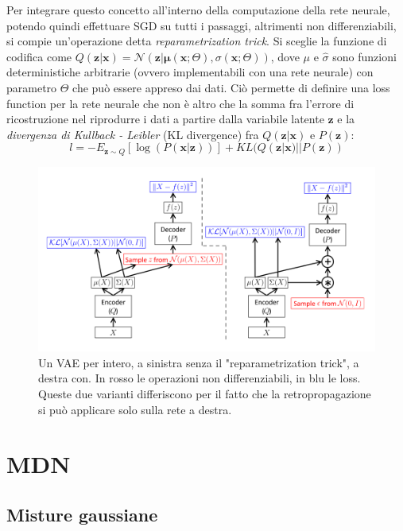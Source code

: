Per integrare questo concetto all'interno della computazione della rete neurale, potendo quindi effettuare SGD su tutti i passaggi, altrimenti non differenziabili, si compie un'operazione detta \textit{reparametrization trick}. Si sceglie la funzione di codifica come $Q(\boldsymbol{z} | \boldsymbol{x}) = \mathcal{N}(\boldsymbol{z} | \boldsymbol{\mu}(\boldsymbol{x}; \Theta), \sigma(\boldsymbol{x}; \Theta))$, dove $\mu$ e $\hat\sigma$ sono funzioni deterministiche arbitrarie (ovvero implementabili con una rete neurale) con parametro $\Theta$ che può essere appreso dai dati. Ciò permette di definire una loss function per la rete neurale che non è altro che la somma fra l'errore di ricostruzione nel riprodurre i dati a partire dalla variabile latente $\boldsymbol{z}$ e la \textit{divergenza di Kullback - Leibler} (KL divergence) fra $Q(\boldsymbol{z} | \boldsymbol{x})$ e $P(\boldsymbol{z})$:
\begin{equation}
	\label{vae_loss}
	l = -E_{\boldsymbol{z}\sim Q}[\log(P(\boldsymbol{x} | \boldsymbol{z}))] + KL(Q(\boldsymbol{z} | \boldsymbol{x}) || P(\boldsymbol{z}))
\end{equation}
\begin{figure}[ht]
	\centering
	\includegraphics[width=\textwidth]{img/vae_struct.png}
	\caption{Un VAE per intero, a sinistra senza il "reparametrization trick", a destra con. In rosso le operazioni non differenziabili, in blu le loss. Queste due varianti differiscono per il fatto che la retropropagazione si può applicare solo sulla rete a destra.}
	\label{fig:1.14}
\end{figure}
\section{MDN}
\subsection{Misture gaussiane} %
\label{sub:misture_gaussiane}

